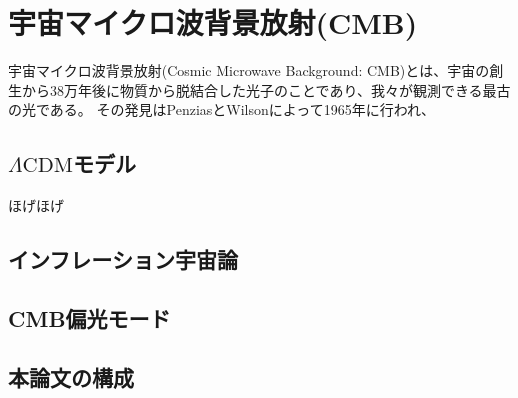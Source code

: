 \documentclass[../../main.tex]{subfiles}
\begin{document}
\chapter{宇宙マイクロ波背景放射(CMB)}
宇宙マイクロ波背景放射(Cosmic Microwave Background: CMB)とは、宇宙の創生から38万年後に物質から脱結合した光子のことであり、我々が観測できる最古の光である。
その発見はPenziasとWilsonによって1965年に行われ\cite{1965ApJ...142..419P}、


\section{$\Lambda\mathrm{CDM}$モデル}
ほげほげ
\section{インフレーション宇宙論}

\section{CMB偏光モード}
\section{本論文の構成}
\end{document}
